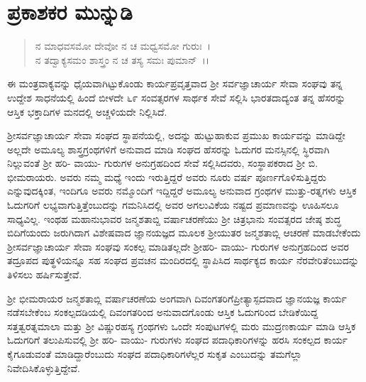 
\chapter*{ಪ್ರಕಾಶಕರ ಮುನ್ನುಡಿ}

\begin{verse}
ನ ಮಾಧವಸಮೋ ದೇವೋ ನ ಚ ಮಧ್ವಸಮೋ ಗುರುಃ~।\\ ನ ತದ್ವಾಕ್ಯಸಮಂ ಶಾಸ್ತ್ರಂ ನ ಚ ತಸ್ಯ ಸಮಃ ಪುಮಾನ್~।।
\end{verse}

ಈ ಮಂತ್ರವಾಕ್ಯವನ್ನು ಧೈಯವಾಗಿಟ್ಟುಕೊಂಡು ಕಾರ್ಯಪ್ರವೃತ್ತವಾದ ಶ‍್ರೀ ಸರ್ವಜ್ಞಾ\-ಚಾರ್ಯ ಸೇವಾ ಸಂಘವು ತನ್ನ ಉದ್ದೇಶ ಸಾಧನೆಯಲ್ಲಿ ಹಿಂದೆ ಬೀಳದೇ ೬೯ ಸಂವತ್ಸರಗಳ ಸಾರ್ಥಕ ಸೇವೆ ಸಲ್ಲಿಸಿ ಭಾರತದಾದ್ಯಂತ ತನ್ನ ಹೆಸರನ್ನು ಆಸ್ತಿಕ ಭಕ್ತಾದಿಗಳ ಮನದಲ್ಲಿ ಅಚ್ಚಳಿಯದೇ ನಿಲ್ಲಿಸಿದೆ.

ಶ‍್ರೀಸರ್ವಜ್ಞಾಚಾರ್ಯ ಸೇವಾ ಸಂಘದ ಸ್ಥಾಪನೆಯಲ್ಲಿ, ಅದನ್ನು ಹುಟ್ಟುಹಾಕುವ ಪ್ರಮುಖ ಕಾರ್ಯವನ್ನು ಮಾಡಿದ್ದೇ ಅಲ್ಲದೇ ಅಮೂಲ್ಯ ಶಾಸ್ತ್ರಗ್ರಂಥಗಳಿಗೆ ಅನುವಾದ ಮಾಡಿ ಸಂಘದ ಹೆಸರನ್ನು ಓದುಗರ ಮನಸ್ಸಿನಲ್ಲಿ ಸ್ಥಿರವಾಗಿ ನಿಲ್ಲುವಂತೆ ಶ‍್ರೀ ಹರಿ- ವಾಯು- ಗುರುಗಳ ಅನುಗ್ರಹದಿಂದ ಸೇವೆ ಸಲ್ಲಿಸಿದವರು, ಸಂಸ್ಥಾಪಕರಾದ ಶ‍್ರೀ ಬಿ. ಭೀಮರಾಯರು. ಅವರು ನಮ್ಮ ಮಧ್ಯೆ ಇಂದು ಇರುತ್ತಿದ್ದರೆ ಅವರು ನೂರು ವರ್ಷ ಪೂರ್ಣಗೊಳಿಸುತ್ತಿದ್ದರು ಎನ್ನುವುದಕ್ಕಿಂತ, ಇಂದಿಗೂ ಅವರು ನಮ್ಮೊಂದಿಗೆ ಇದ್ದಿದ್ದರೆ ಅಮೂಲ್ಯ ಅನುವಾದ ಗ್ರಂಥಗಳ ಮುತ್ತು-ರತ್ನಗಳು ಆಸ್ತಿಕ ಓದುಗರಿಗೆ ಲಭ್ಯವಾಗುತ್ತಿತ್ತೆಂಬುದನ್ನು ಗಮನಿಸಿದಲ್ಲಿ ಅವರ ಅಗಲುವಿಕೆಯ ನಷ್ಟದ ಪ್ರಮಾಣವನ್ನು ಊಹಿಸಲೂ ಸಾಧ್ಯವಿಲ್ಲ. ಇಂಥಹ ಮಹಾನುಭಾವರ ಜನ್ಮಶತಾಬ್ದಿ ವರ್ಷಾಚರಣೆಯು ಶ‍್ರೀ ಚಿತ್ರಭಾನು ಸಂವತ್ಸರದ ಜೇಷ್ಠ ಶುದ್ಧ ಬಿದಿಗೆಯಂದು ಜರುಗಿದಾಗ ವಿಶೇಷವಾದ ಜ್ಞಾನಯಜ್ಞದ ಮೂಲಕ ಶ‍್ರೀಯುತರ ಜನ್ಮಶತಾಬ್ಲಿ ಆಚರಣೆ ಮಾಡಬೇಕೆಂದು ಶ‍್ರೀಸರ್ವಜ್ಞಾಚಾರ್ಯ ಸೇವಾ ಸಂಘವು ಸಂಕಲ್ಪ ಮಾಡಿತಲ್ಲದೇ ಶ‍್ರೀಹರಿ- ವಾಯು- ಗುರುಗಳ ಅನುಗ್ರಹದಿಂದ ಅವರ ತದ್ರೂಪದ ಪುತ್ಥಳಿಯನ್ನೂ ಸಹ ಸಂಘದ ಪ್ರವಚನ ಮಂದಿರದಲ್ಲಿ ಸ್ಥಾಪಿಸಿದ ಸಾರ್ಥಕ್ಯದ ಕಾರ್ಯ ನೆರವೇರಿತೆಂಬುದನ್ನು ತಿಳಿಸಲು ಹರ್ಷಿಸುತ್ತೇವೆ.

\newpage

ಶ‍್ರೀ ಭೀಮರಾಯರ ಜನ್ಮಶತಾಬ್ಲಿ ವರ್ಷಾಚರಣೆಯ ಅಂಗವಾಗಿ ದಿವಂಗತರಿಗೆ\break ಪ್ರೀತ್ಯಾಸ್ಪದವಾದ ಜ್ಞಾನಯಜ್ಞ ಕಾರ್ಯ ನಡೆಸಬೇಕೆಂಬ ಸಂಕಲ್ಪದಡಿಯಲ್ಲಿ ದಿವಂಗತರಿಂದ ಅನುವಾದಗೊಂಡು ಆಸ್ತಿಕ ಓದುಗರಿಂದ ಬೇಡಿಕೆಯಿದ್ದ ಸತ್ತತ್ವರತ್ನಮಾಲಾ ಮತ್ತು ಶ‍್ರೀ ವಿಷ್ಣುರಹಸ್ಯ ಗ್ರಂಥಗಳು ಒಂದೇ ಸಂಪುಟಗಳಲ್ಲಿ ಮರು ಮುದ್ರಣಕಾರ್ಯ ಮಾಡಿ ಆಸ್ತಿಕ ಓದುಗರಿಗೆ ತಲುಪಿಸುವಲ್ಲಿ ಶ‍್ರೀ ಹರಿ- ವಾಯು- ಗುರುಗಳು ಸಂಘದ ಪದಾಧಿಕಾರಿಗಳನ್ನು ಹರಸಿ ಸಂಕಲ್ಪದ ಕಾರ್ಯ ಕೈಗೂಡುವಂತೆ ಮಾಡಿದ್ದಾರೆಂಬುದು ಸಂಘದ ಪದಾಧಿಕಾರಿಗಳೆಲ್ಲರ ಸುಕೃತ ಎಂಬುದನ್ನು ತಮಗೆಲ್ಲಾ ನಿವೇದಿಸಿಕೊಳ್ಳುತ್ತಿದ್ದೇವೆ.


